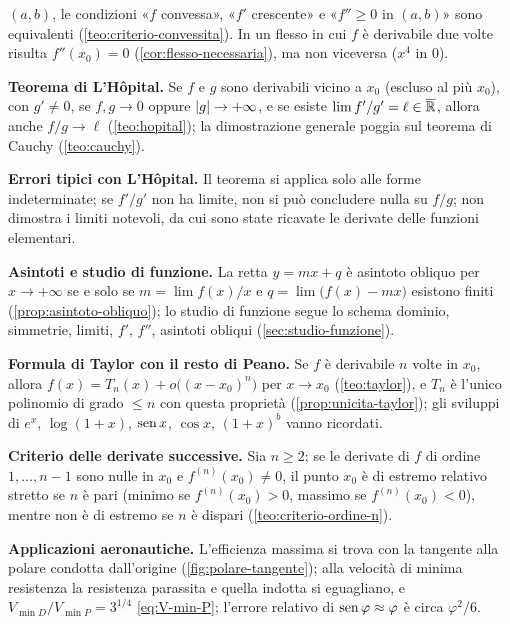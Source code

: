 \begin{puntichiave}
$(a,b)$, le condizioni «$f$ convessa», «$f'$ crescente» e «$f''\ge0$ in $(a,b)$» sono
equivalenti (\cref{teo:criterio-convessita}). In un flesso in cui $f$ è derivabile due
volte risulta $f''(x_{0})=0$ (\cref{cor:flesso-necessaria}), ma non viceversa ($x^{4}$ in
$0$).
\item \textbf{Teorema di L'Hôpital.} Se $f$ e $g$ sono derivabili vicino a $x_{0}$ (escluso
al più $x_{0}$), con $g'\neq0$, se $f,g\to0$ oppure $\lvert g\rvert\to+\infty$, e se esiste
$\lim f'/g'=\ell\in\overline{\mathbb{R}}$, allora anche $f/g\to\ell$
(\cref{teo:hopital}); la dimostrazione generale poggia sul teorema di Cauchy
(\cref{teo:cauchy}).
\item \textbf{Errori tipici con L'Hôpital.} Il teorema si applica solo alle forme
indeterminate; se $f'/g'$ non ha limite, non si può concludere nulla su
$f/g$; non dimostra i limiti notevoli, da cui sono state ricavate le derivate delle
funzioni elementari.
\item \textbf{Asintoti e studio di funzione.} La retta $y=mx+q$ è asintoto obliquo per
$x\to+\infty$ se e solo se $m=\lim f(x)/x$ e $q=\lim\bigl(f(x)-mx\bigr)$ esistono
finiti (\cref{prop:asintoto-obliquo}); lo studio di funzione segue lo schema dominio,
simmetrie, limiti, $f'$, $f''$, asintoti obliqui (\cref{sec:studio-funzione}).
\item \textbf{Formula di Taylor con il resto di Peano.} Se $f$ è derivabile $n$ volte in
$x_{0}$, allora $f(x)=T_{n}(x)+o\bigl((x-x_{0})^{n}\bigr)$ per $x\to x_{0}$
(\cref{teo:taylor}), e $T_{n}$ è l'unico polinomio di grado $\le n$ con questa proprietà
(\cref{prop:unicita-taylor}); gli sviluppi di $e^{x}$, $\log(1+x)$, $\operatorname{sen} x$, $\cos x$,
$(1+x)^{b}$ vanno ricordati.
\item \textbf{Criterio delle derivate successive.} Sia $n\ge2$; se le derivate di $f$ di
ordine $1,\dots,n-1$ sono nulle in $x_{0}$ e $f^{(n)}(x_{0})\neq0$, il punto $x_{0}$ è di
estremo relativo stretto se $n$ è pari (minimo se $f^{(n)}(x_{0})>0$, massimo se
$f^{(n)}(x_{0})<0$), mentre non è di estremo se $n$ è dispari
(\cref{teo:criterio-ordine-n}).
\item \textbf{Applicazioni aeronautiche.} L'efficienza massima si trova con la tangente
alla polare condotta dall'origine (\cref{fig:polare-tangente}); alla velocità di minima
resistenza la resistenza parassita e quella indotta si eguagliano, e
$V_{\min D}/V_{\min P}=3^{1/4}$ \eqref{eq:V-min-P}; l'errore relativo di
$\operatorname{sen}\varphi\approx\varphi$ è circa $\varphi^{2}/6$.
\end{puntichiave}

